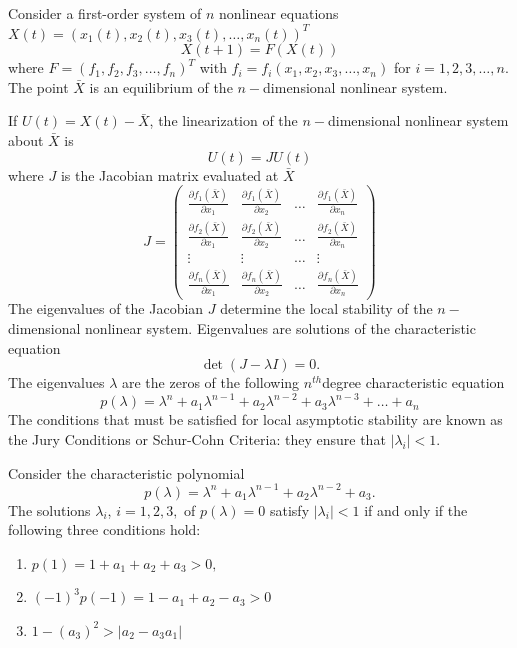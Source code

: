 Consider a first-order system of $n$ nonlinear equations $X(t)=(x_1(t),x_2(t), x_3(t), \dots , x_n(t))^T$
$$X(t+1)=F(X(t))$$
where $F=(f_1,f_2,f_3, \dots , f_n)^T$ with $f_i=f_i(x_1,x_2,x_3,\dots , x_n)$ for $i=1,2,3,\dots ,n$. The point $\bar X$ is an equilibrium of the $n-$dimensional nonlinear system.

If $U(t)=X(t)-\bar X$, the linearization of the $n-$dimensional nonlinear system about $\bar X $ is
$$U(t)=J U(t)$$
where $J$ is the Jacobian matrix evaluated at $\bar X$
$$
J=\left ( 
\begin{array}{cccc}
\frac{\partial f_1 (\bar X)}{\partial x_1} & \frac{\partial f_1 (\bar X)}{\partial x_2} & \hdots & \frac{\partial f_1 (\bar X)}{\partial x_n}\\
\frac{\partial f_2 (\bar X)}{\partial x_1} & \frac{\partial f_2 (\bar X)}{\partial x_2} & \hdots & \frac{\partial f_2 (\bar X)}{\partial x_n}\\
\vdots & \vdots & \hdots & \vdots \\
\frac{\partial f_n (\bar X)}{\partial x_1} & \frac{\partial f_n (\bar X)}{\partial x_2} & \hdots & \frac{\partial f_n (\bar X)}{\partial x_n}
\end{array}
\right )
$$ 
The eigenvalues of the Jacobian $J$ determine the local stability of the $n-$dimensional nonlinear system. Eigenvalues are solutions of the characteristic equation
$$\det (J -\lambda I)=0.$$
The eigenvalues $\lambda $ are the zeros of the following $n^{th}$degree characteristic equation
\begin{equation}
p(\lambda)=\lambda ^n + a_1 \lambda ^{n-1}+ a_2 \lambda ^{n-2}+a_3 \lambda ^{n-3}+\dots + a_n\label{eq:CharacN}
\end{equation}
The conditions that must be satisfied for local asymptotic stability are known as the Jury Conditions or Schur-Cohn Criteria: they ensure that $|\lambda _i|<1$.

\begin{theorem}[Jury conditions or Schur-Cohn Criteria, for $n=3$]
Consider the characteristic polynomial $$p(\lambda)=\lambda ^n + a_1 \lambda ^{n-1}+ a_2 \lambda ^{n-2}+a_3 .$$
The solutions $\lambda _i$, $i=1,2,3,$ of $p(\lambda)=0$ satisfy $|\lambda _i|<1$ if and only if the following three conditions hold:
\begin{enumerate}
\item $p(1)=1+a_1+a_2+a_3>0,$
\item $(-1)^3p(-1)=1-a_1+a_2-a_3>0$
\item $1-(a_3)^2>|a_2 -a_3a_1|$
\end{enumerate}
\end{theorem}


